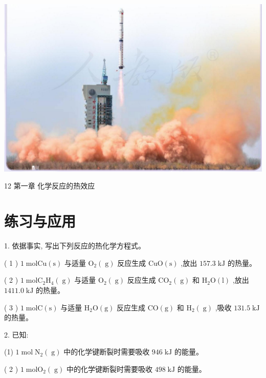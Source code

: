 \documentclass[10pt]{article}
\begin{document}
\begin{center}
\includegraphics[max width=1.0\textwidth]{images/0190da9d-8bfd-732f-bc2c-0b21d0f13b91_17_914374.jpg}
\end{center}

12 第一章 化学反应的热效应

\section*{练习与应用}

1. 依据事实, 写出下列反应的热化学方程式。

( 1 ) \(1\mathrm{\;{mol}}\mathrm{{Cu}}\left( \mathrm{s}\right)\) 与适量 \({\mathrm{O}}_{2}\left( \mathrm{\;g}\right)\) 反应生成 \(\mathrm{{CuO}}\left( \mathrm{s}\right)\) ,放出 \({157.3}\mathrm{\;{kJ}}\) 的热量。

( 2 ) \(1\mathrm{\;{mol}}{\mathrm{C}}_{2}{\mathrm{H}}_{4}\left( \mathrm{\;g}\right)\) 与适量 \({\mathrm{O}}_{2}\left( \mathrm{\;g}\right)\) 反应生成 \({\mathrm{{CO}}}_{2}\left( \mathrm{\;g}\right)\) 和 \({\mathrm{H}}_{2}\mathrm{O}\left( \mathrm{l}\right)\) ,放出 \({1411.0}\mathrm{\;{kJ}}\) 的热量。

( 3 ) \(1\mathrm{\;{mol}}\mathrm{C}\left( \mathrm{s}\right)\) 与适量 \({\mathrm{H}}_{2}\mathrm{O}\left( \mathrm{g}\right)\) 反应生成 \(\mathrm{{CO}}\left( \mathrm{g}\right)\) 和 \({\mathrm{H}}_{2}\left( \mathrm{\;g}\right)\) ,吸收 \({131.5}\mathrm{\;{kJ}}\) 的热量。

2. 已知:

(1) \(1\mathrm{\;{mol}}{\mathrm{\;N}}_{2}\left( \mathrm{\;g}\right)\) 中的化学键断裂时需要吸收 \({946}\mathrm{\;{kJ}}\) 的能量。

( 2 ) \(1\mathrm{\;{mol}}{\mathrm{O}}_{2}\left( \mathrm{\;g}\right)\) 中的化学键断裂时需要吸收 \({498}\mathrm{\;{kJ}}\) 的能量。
\end{document}
